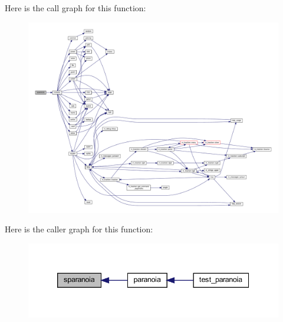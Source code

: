 Here is the call graph for this function\+:
\nopagebreak
\begin{figure}[H]
\begin{center}
\leavevmode
\includegraphics[width=350pt]{sparanoia_8f90_a3924a135a277ffc4f0b2271ccde40373_cgraph}
\end{center}
\end{figure}
Here is the caller graph for this function\+:
\nopagebreak
\begin{figure}[H]
\begin{center}
\leavevmode
\includegraphics[width=339pt]{sparanoia_8f90_a3924a135a277ffc4f0b2271ccde40373_icgraph}
\end{center}
\end{figure}
\mbox{\label{sparanoia_8f90_a8a741debf119a02e8107542c840aa910}} 
